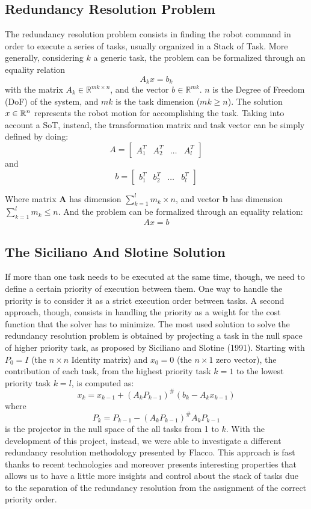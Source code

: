 \documentclass[12pt, a4paper]{article}
\newcommand{\R}{\mathbb{R}}
\begin{document}
\subsection{Redundancy Resolution Problem}
The redundancy resolution problem consists in finding the robot command in order to execute a series of tasks, usually organized in a Stack of Task.
More generally, considering $k$ a generic task, the problem can be formalized through an equality relation \[A_kx=b_k\]
with the matrix $A_k \in \R^{mk \times n}$, and the vector $b \in \R^{mk}$. $n$ is the Degree of Freedom (DoF) of the system, and $mk$ is the task dimension ($mk \geq n$). The solution $x \in \Bbb R^n$ represents the robot motion for accomplishing the task.
Taking into account a SoT, instead, the transformation matrix and task vector can be simply defined by doing:
\[A=\begin{bmatrix}
A_1^T & A_2^T & \dots & A_l^T
\end{bmatrix}
\]
and
\[b=\begin{bmatrix}
b_1^T & b_2^T & \dots & b_l^T
\end{bmatrix}
\]

Where matrix \textbf{A} has dimension $\sum_{k=1}^l m_k \times n$, and vector \textbf{b} has dimension $\sum_{k=1}^l m_k \leq n$.
And the problem can be formalized through an equality relation: \[Ax = b\]

\subsection{The Siciliano And Slotine Solution}

If more than one task needs to be executed at the same time, though, we need to define a certain priority of execution between them. One way to handle the priority is  to consider it as a strict execution order between tasks. A second approach, though, consists in handling the priority as a weight for the cost function that the solver has to minimize.
The most used solution to solve the redundancy resolution problem is obtained by projecting a task in the null space of higher priority task, as proposed by Siciliano and Slotine (1991). Starting with $P_0 = I$ (the $n \times n$ Identity matrix) and $x_0 = 0$ (the $n \times 1$ zero vector), the contribution of each task, from the highest priority task $k = 1$ to the lowest priority task $k = l$, is computed as:
\[
x_k = x_{k-1} + (A_kP_{k-1})^{\#}(b_k - A_kx_{k-1})
\]where \[
P_k = P_{k-1}-(A_kP_{k-1})^{\#}A_kP_{k-1}
\]
is the projector in the null space of the all tasks from 1 to $k$.
With the development of this project, instead, we were able to investigate a different redundancy resolution methodology presented by Flacco. This approach is fast thanks to recent technologies and moreover presents interesting properties that allows us to have a little more insights and control about the stack of tasks due to the separation of the redundancy resolution from the assignment of the correct priority order. 
\end{document}
